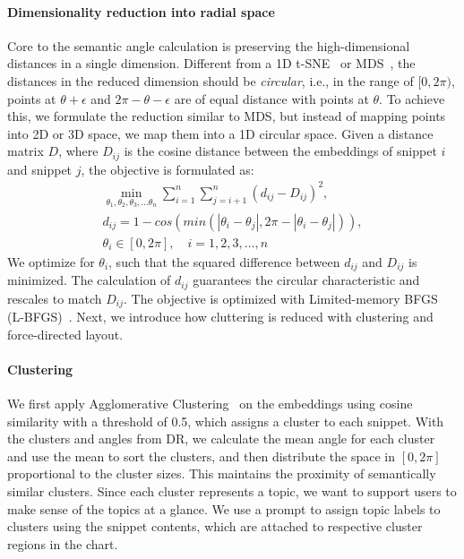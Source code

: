 \paragraph{Dimensionality reduction into radial space}
Core to the semantic angle calculation is preserving the high-dimensional distances in a single dimension. Different from a 1D t-SNE~\cite{van2008tsne} or MDS~\cite{cox2000mds}, the distances in the reduced dimension should be \textit{circular}, i.e., in the range of $[0, 2\pi)$, points at $\theta+\epsilon$ and $2\pi-\theta-\epsilon$ are of equal distance with points at $\theta$.
To achieve this, we formulate the reduction similar to MDS, but instead of mapping points into 2D or 3D space, we map them into a 1D circular space.
Given a distance matrix $D$, where $D_{ij}$ is the cosine distance between the embeddings of snippet $i$ and snippet $j$, the objective is formulated as:
\begin{equation}\label{eq: dr}
    \begin{split}
    \min_{\theta_1,\theta_2,\theta_3,...\theta_n}\displaystyle \sum_{i=1}^{n}\sum_{j=i+1}^{n}(d_{ij} - D_{ij})^2, \\
    d_{ij}=1 - cos(min(|\theta_i - \theta_j|, 2\pi - |\theta_i - \theta_j|)), \\
    \theta_i \in [0, 2\pi], \quad i = 1,2,3,\dots, n
    \end{split}
\end{equation}
We optimize for $\theta_i$, such that the squared difference between $d_{ij}$ and $D_{ij}$ is minimized. 
The calculation of $d_{ij}$ guarantees the circular characteristic and rescales to match $D_{ij}$. The objective is optimized with Limited-memory BFGS (L-BFGS)~\cite{liu1989limited}.
Next, we introduce how cluttering is reduced with clustering and force-directed layout.

\paragraph{Clustering}
We first apply Agglomerative Clustering~\cite{steinbach2000doccluster} on the embeddings using cosine similarity with a threshold of 0.5, which assigns a cluster to each snippet. With the clusters and angles from DR, we calculate the mean angle for each cluster and use the mean to sort the clusters, and then distribute the space in $[0, 2\pi]$ proportional to the cluster sizes. This maintains the proximity of semantically similar clusters. Since each cluster represents a topic, we want to support users to make sense of the topics at a glance. We use a prompt to assign topic labels to clusters using the snippet contents, which are attached to respective cluster regions in the chart.

